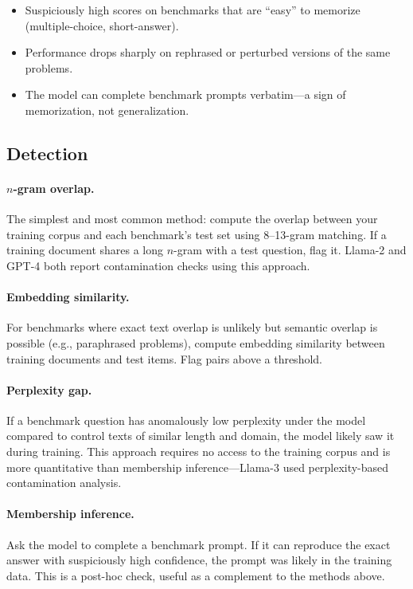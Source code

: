 \begin{itemize}[nosep]
  \item Suspiciously high scores on benchmarks that are ``easy'' to memorize (multiple-choice, short-answer).
  \item Performance drops sharply on rephrased or perturbed versions of the same problems.
  \item The model can complete benchmark prompts verbatim---a sign of memorization, not generalization.
\end{itemize}

\subsection{Detection}

\paragraph{$n$-gram overlap.} The simplest and most common method: compute the overlap between your training corpus and each benchmark's test set using 8--13-gram matching. If a training document shares a long $n$-gram with a test question, flag it. Llama-2 and GPT-4 both report contamination checks using this approach.

\paragraph{Embedding similarity.} For benchmarks where exact text overlap is unlikely but semantic overlap is possible (e.g., paraphrased problems), compute embedding similarity between training documents and test items. Flag pairs above a threshold.

\paragraph{Perplexity gap.} If a benchmark question has anomalously low perplexity under the model compared to control texts of similar length and domain, the model likely saw it during training. This approach requires no access to the training corpus and is more quantitative than membership inference---Llama-3 used perplexity-based contamination analysis.

\paragraph{Membership inference.} Ask the model to complete a benchmark prompt. If it can reproduce the exact answer with suspiciously high confidence, the prompt was likely in the training data. This is a post-hoc check, useful as a complement to the methods above.

